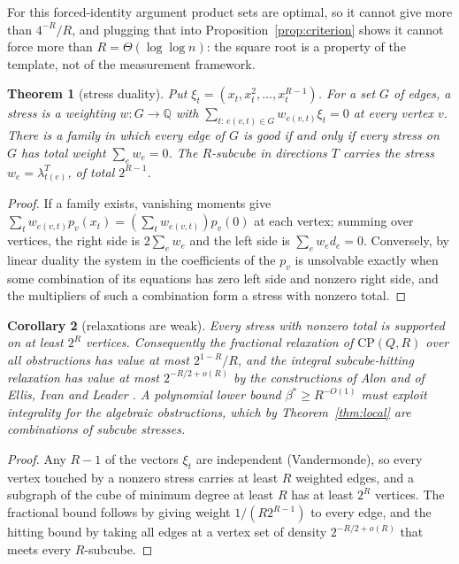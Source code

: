 \documentclass[11pt]{article}
\newtheorem{theorem}{Theorem}
\newtheorem{corollary}[theorem]{Corollary}
\theoremstyle{definition}
\theoremstyle{remark}
\newcommand{\Q}{\mathbb{Q}}
\newcommand{\CP}{\mathrm{CP}}
\begin{document}
For this forced-identity argument product sets are optimal, so it cannot give more than $4^{-R}/R$, and plugging that into Proposition~\ref{prop:criterion} shows it cannot force more than $R=\Theta(\log\log n)$: the square root is a property of the template, not of the measurement framework.

\begin{theorem}[stress duality]\label{thm:stress}
Put $\xi_t=(x_t,x_t^2,\dots,x_t^{R-1})$. For a set $G$ of edges, a \emph{stress} is a weighting $w:G\to\Q$ with $\sum_{t:\,e(v,t)\in G}w_{e(v,t)}\xi_t=0$ at every vertex $v$. There is a family in which every edge of $G$ is good if and only if every stress on $G$ has total weight $\sum_ew_e=0$. The $R$-subcube in directions $T$ carries the stress $w_e=\lambda^T_{t(e)}$, of total $2^{R-1}$.
\end{theorem}

\begin{proof}
If a family exists, vanishing moments give $\sum_tw_{e(v,t)}p_v(x_t)=(\sum_tw_{e(v,t)})p_v(0)$ at each vertex; summing over vertices, the right side is $2\sum_ew_e$ and the left side is $\sum_ew_ed_e=0$. Conversely, by linear duality the system in the coefficients of the $p_v$ is unsolvable exactly when some combination of its equations has zero left side and nonzero right side, and the multipliers of such a combination form a stress with nonzero total.
\end{proof}

\begin{corollary}[relaxations are weak]\label{cor:weak}
Every stress with nonzero total is supported on at least $2^R$ vertices. Consequently the fractional relaxation of $\CP(Q,R)$ over all obstructions has value at most $2^{1-R}/R$, and the integral subcube-hitting relaxation has value at most $2^{-R/2+o(R)}$ by the constructions of Alon \cite{alon} and of Ellis, Ivan and Leader \cite{eil}. A polynomial lower bound $\beta^*\ge R^{-O(1)}$ must exploit integrality for the algebraic obstructions, which by Theorem~\ref{thm:local} are combinations of subcube stresses.
\end{corollary}

\begin{proof}
Any $R-1$ of the vectors $\xi_t$ are independent (Vandermonde), so every vertex touched by a nonzero stress carries at least $R$ weighted edges, and a subgraph of the cube of minimum degree at least $R$ has at least $2^R$ vertices. The fractional bound follows by giving weight $1/(R2^{R-1})$ to every edge, and the hitting bound by taking all edges at a vertex set of density $2^{-R/2+o(R)}$ that meets every $R$-subcube.
\end{proof}
\end{document}
